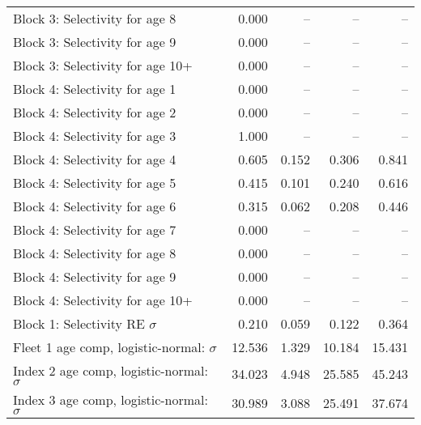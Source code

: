 \documentclass[
]{article}
\begin{document}
\begin{landscape}
\begin{longtable}[t]{lrrrr}
Block 3: Selectivity for age 8 & 0.000 & -- & -- & --\\
Block 3: Selectivity for age 9 & 0.000 & -- & -- & --\\
Block 3: Selectivity for age 10+ & 0.000 & -- & -- & --\\
Block 4: Selectivity for age 1 & 0.000 & -- & -- & --\\
\addlinespace
Block 4: Selectivity for age 2 & 0.000 & -- & -- & --\\
Block 4: Selectivity for age 3 & 1.000 & -- & -- & --\\
Block 4: Selectivity for age 4 & 0.605 & 0.152 & 0.306 & 0.841\\
Block 4: Selectivity for age 5 & 0.415 & 0.101 & 0.240 & 0.616\\
Block 4: Selectivity for age 6 & 0.315 & 0.062 & 0.208 & 0.446\\
\addlinespace
Block 4: Selectivity for age 7 & 0.000 & -- & -- & --\\
Block 4: Selectivity for age 8 & 0.000 & -- & -- & --\\
Block 4: Selectivity for age 9 & 0.000 & -- & -- & --\\
Block 4: Selectivity for age 10+ & 0.000 & -- & -- & --\\
Block 1: Selectivity RE $\sigma$ & 0.210 & 0.059 & 0.122 & 0.364\\
\addlinespace
Fleet 1 age comp, logistic-normal: $\sigma$ & 12.536 & 1.329 & 10.184 & 15.431\\
Index 2 age comp, logistic-normal: $\sigma$ & 34.023 & 4.948 & 25.585 & 45.243\\
Index 3 age comp, logistic-normal: $\sigma$ & 30.989 & 3.088 & 25.491 & 37.674\\*
\end{longtable}
\end{landscape}
\end{document}

